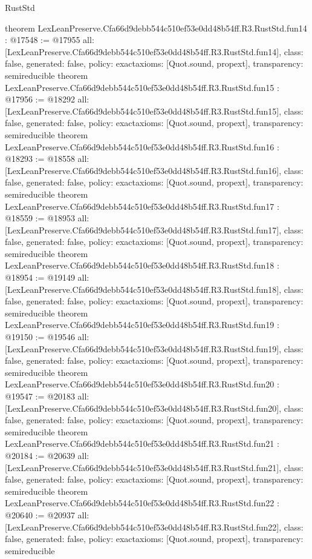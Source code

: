 \begin{lexlean}{RustStd}
\begin{coremodule}
{}
theorem LexLeanPreserve.Cfa66d9debb544c510ef53e0dd48b54ff.R3.RustStd.fun14 : @17548 := @17955 {
  all: [LexLeanPreserve.Cfa66d9debb544c510ef53e0dd48b54ff.R3.RustStd.fun14],
  class: false,
  generated: false,
  policy: exact{axioms: [Quot.sound, propext]},
  transparency: semireducible
}
theorem LexLeanPreserve.Cfa66d9debb544c510ef53e0dd48b54ff.R3.RustStd.fun15 : @17956 := @18292 {
  all: [LexLeanPreserve.Cfa66d9debb544c510ef53e0dd48b54ff.R3.RustStd.fun15],
  class: false,
  generated: false,
  policy: exact{axioms: [Quot.sound, propext]},
  transparency: semireducible
}
theorem LexLeanPreserve.Cfa66d9debb544c510ef53e0dd48b54ff.R3.RustStd.fun16 : @18293 := @18558 {
  all: [LexLeanPreserve.Cfa66d9debb544c510ef53e0dd48b54ff.R3.RustStd.fun16],
  class: false,
  generated: false,
  policy: exact{axioms: [Quot.sound, propext]},
  transparency: semireducible
}
theorem LexLeanPreserve.Cfa66d9debb544c510ef53e0dd48b54ff.R3.RustStd.fun17 : @18559 := @18953 {
  all: [LexLeanPreserve.Cfa66d9debb544c510ef53e0dd48b54ff.R3.RustStd.fun17],
  class: false,
  generated: false,
  policy: exact{axioms: [Quot.sound, propext]},
  transparency: semireducible
}
theorem LexLeanPreserve.Cfa66d9debb544c510ef53e0dd48b54ff.R3.RustStd.fun18 : @18954 := @19149 {
  all: [LexLeanPreserve.Cfa66d9debb544c510ef53e0dd48b54ff.R3.RustStd.fun18],
  class: false,
  generated: false,
  policy: exact{axioms: [Quot.sound, propext]},
  transparency: semireducible
}
theorem LexLeanPreserve.Cfa66d9debb544c510ef53e0dd48b54ff.R3.RustStd.fun19 : @19150 := @19546 {
  all: [LexLeanPreserve.Cfa66d9debb544c510ef53e0dd48b54ff.R3.RustStd.fun19],
  class: false,
  generated: false,
  policy: exact{axioms: [Quot.sound, propext]},
  transparency: semireducible
}
theorem LexLeanPreserve.Cfa66d9debb544c510ef53e0dd48b54ff.R3.RustStd.fun20 : @19547 := @20183 {
  all: [LexLeanPreserve.Cfa66d9debb544c510ef53e0dd48b54ff.R3.RustStd.fun20],
  class: false,
  generated: false,
  policy: exact{axioms: [Quot.sound, propext]},
  transparency: semireducible
}
theorem LexLeanPreserve.Cfa66d9debb544c510ef53e0dd48b54ff.R3.RustStd.fun21 : @20184 := @20639 {
  all: [LexLeanPreserve.Cfa66d9debb544c510ef53e0dd48b54ff.R3.RustStd.fun21],
  class: false,
  generated: false,
  policy: exact{axioms: [Quot.sound, propext]},
  transparency: semireducible
}
theorem LexLeanPreserve.Cfa66d9debb544c510ef53e0dd48b54ff.R3.RustStd.fun22 : @20640 := @20937 {
  all: [LexLeanPreserve.Cfa66d9debb544c510ef53e0dd48b54ff.R3.RustStd.fun22],
  class: false,
  generated: false,
  policy: exact{axioms: [Quot.sound, propext]},
  transparency: semireducible
}
\end{coremodule}
\end{lexlean}
